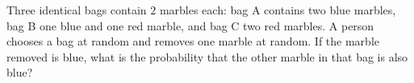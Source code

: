 Three identical bags contain $2$ marbles each: bag A contains two blue marbles, bag B one blue and one red marble, and bag C two red marbles. A person chooses a bag at random and removes one marble at random. If the marble removed is blue, what is the probability that the other marble in that bag is also blue?
